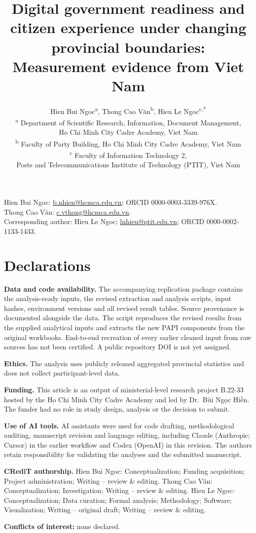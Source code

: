 \documentclass[11pt]{article}
\title{Digital government readiness and citizen experience under changing provincial boundaries: Measurement evidence from Viet Nam}
\author{\small Hien Bui Ngoc\textsuperscript{a}, Thong Cao Văn\textsuperscript{b}, Hieu Le Ngoc\textsuperscript{c,*}\\[0.4em]
\footnotesize \textsuperscript{a} Department of Scientific Research, Information, Document Management,\\
Ho Chi Minh City Cadre Academy, Viet Nam\\[0.2em]
\textsuperscript{b} Faculty of Party Building, Ho Chi Minh City Cadre Academy, Viet Nam\\[0.2em]
\textsuperscript{c} Faculty of Information Technology 2,\\
Posts and Telecommunications Institute of Technology (PTIT), Viet Nam}
\date{}
\begin{document}
\maketitle
\begin{center}\small
Hien Bui Ngoc: \href{mailto:b.nhien@hcmca.edu.vn}{b.nhien@hcmca.edu.vn}; ORCID 0000-0003-3339-976X.\\
Thong Cao Văn: \href{mailto:c.vthong@hcmca.edu.vn}{c.vthong@hcmca.edu.vn}.\\
Corresponding author: Hieu Le Ngoc; \href{mailto:lnhieu@ptit.edu.vn}{lnhieu@ptit.edu.vn}; ORCID 0000-0002-1133-1433.
\end{center}
\section*{Declarations}
\textbf{Data and code availability.} The accompanying replication package contains the analysis-ready inputs, the revised extraction and analysis scripts, input hashes, environment versions and all revised result tables. Source provenance is documented alongside the data. The script reproduces the revised results from the supplied analytical inputs and extracts the new PAPI components from the original workbooks. End-to-end recreation of every earlier cleaned input from raw sources has not been certified. A public repository DOI is not yet assigned.

\textbf{Ethics.} The analysis uses publicly released aggregated provincial statistics and does not collect participant-level data.

\textbf{Funding.} This article is an output of ministerial-level research project B.22-33 hosted by the Ho Chi Minh City Cadre Academy and led by Dr.\ Bùi Ngọc Hiền. The funder had no role in study design, analysis or the decision to submit.

\textbf{Use of AI tools.} AI assistants were used for code drafting, methodological auditing, manuscript revision and language editing, including Claude (Anthropic; Cursor) in the earlier workflow and Codex (OpenAI) in this revision. The authors retain responsibility for validating the analyses and the submitted manuscript.

\textbf{CRediT authorship.} Hien Bui Ngoc: Conceptualization; Funding acquisition; Project administration; Writing -- review \& editing. Thong Cao Văn: Conceptualization; Investigation; Writing -- review \& editing. Hieu Le Ngoc: Conceptualization; Data curation; Formal analysis; Methodology; Software; Visualization; Writing -- original draft; Writing -- review \& editing.

\textbf{Conflicts of interest:} none declared.
\end{document}
